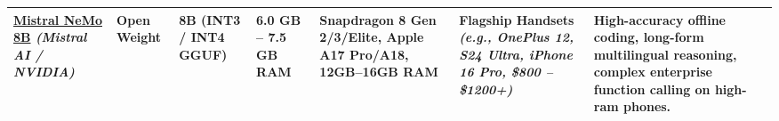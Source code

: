 \documentclass[10pt,landscape,a4paper]{article}
\begin{document}
\begin{longtable}{p{2.6cm} p{1.6cm} p{1.8cm} p{2.2cm} p{2.6cm} p{4.2cm} p{6.8cm}}
    \textbf{\href{https://huggingface.co/nvidia/Mistral-NeMo-Minitron-8B-Base}{Mistral NeMo 8B}} \newline \textit{(Mistral AI / NVIDIA)} & Open Weight & 8B \newline (INT3 / INT4 GGUF) & 6.0 GB -- 7.5 GB RAM & Snapdragon 8 Gen 2/3/Elite, Apple A17 Pro/A18, 12GB--16GB RAM & \textbf{Flagship Handsets} \newline \textit{(e.g., OnePlus 12, S24 Ultra, iPhone 16 Pro, \$800 -- \$1200+)} & High-accuracy offline coding, long-form multilingual reasoning, complex enterprise function calling on high-ram phones. \\

    \hline
\end{longtable}
\end{document}
